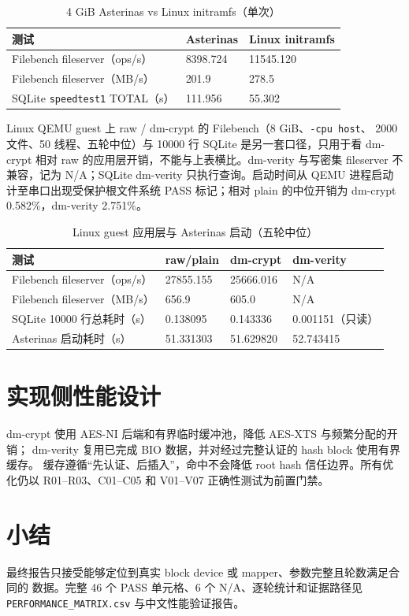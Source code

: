 \begin{table}[H]
    \centering
    \caption{4 GiB Asterinas vs Linux initramfs（单次）}
    \begin{tabular}{p{}p{}p{}}
        \toprule
        \textbf{测试} & \textbf{Asterinas} & \textbf{Linux initramfs} \\
        \midrule
        Filebench fileserver（ops/s） & 8398.724 & 11545.120 \\
        Filebench fileserver（MB/s） & 201.9 & 278.5 \\
        SQLite \texttt{speedtest1} TOTAL（s） & 111.956 & 55.302 \\
        \bottomrule
    \end{tabular}
\end{table}

Linux QEMU guest 上 raw / dm-crypt 的 Filebench（8 GiB、\texttt{-cpu host}、
2000 文件、50 线程、五轮中位）与 10000 行 SQLite 是另一套口径，只用于看
dm-crypt 相对 raw 的应用层开销，不能与上表横比。dm-verity 与写密集
fileserver 不兼容，记为 N/A；SQLite dm-verity 只执行查询。启动时间从 QEMU
进程启动计至串口出现受保护根文件系统 PASS 标记；相对 plain 的中位开销为
dm-crypt 0.582\%，dm-verity 2.751\%。

\begin{table}[H]
    \centering
    \caption{Linux guest 应用层与 Asterinas 启动（五轮中位）}
    \begin{tabular}{p{}p{}p{}p{}}
        \toprule
        \textbf{测试} & \textbf{raw/plain} & \textbf{dm-crypt} & \textbf{dm-verity} \\
        \midrule
        Filebench fileserver（ops/s） & 27855.155 & 25666.016 & N/A \\
        Filebench fileserver（MB/s） & 656.9 & 605.0 & N/A \\
        SQLite 10000 行总耗时（s） & 0.138095 & 0.143336 & 0.001151（只读） \\
        Asterinas 启动耗时（s） & 51.331303 & 51.629820 & 52.743415 \\
        \bottomrule
    \end{tabular}
\end{table}

\section{实现侧性能设计}

dm-crypt 使用 AES-NI 后端和有界临时缓冲池，降低 AES-XTS 与频繁分配的开销；
dm-verity 复用已完成 BIO 数据，并对经过完整认证的 hash block 使用有界缓存。
缓存遵循“先认证、后插入”，命中不会降低 root hash 信任边界。所有优化仍以
R01--R03、C01--C05 和 V01--V07 正确性测试为前置门禁。

\section{小结}

最终报告只接受能够定位到真实 block device 或 mapper、参数完整且轮数满足合同的
数据。完整 46 个 PASS 单元格、6 个 N/A、逐轮统计和证据路径见
\texttt{PERFORMANCE\_\allowbreak MATRIX.csv} 与中文性能验证报告。